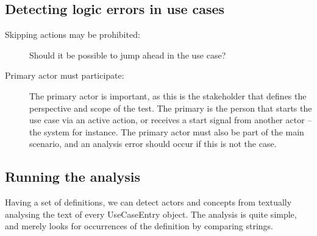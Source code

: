 \subsection{Detecting logic errors in use cases}

\begin{description}
  \item[Skipping actions may be prohibited:] Should it be possible to jump ahead in the use case?
  \item[Primary actor must participate:] The primary actor is important, as this is the stakeholder that defines the perspective and scope of the test. The primary is the person that starts the use case via an active action, or receives a start signal from another actor -- the system for instance. The primary actor must also be part of the main scenario, and an analysis error should occur if this is not the case.

\end{description}







\subsection{Running the analysis}
Having a set of definitions, we can detect actors and concepts from textually analysing the text of every UseCaseEntry object. The analysis is quite simple, and merely looks for occurrences of the definition by comparing strings.

